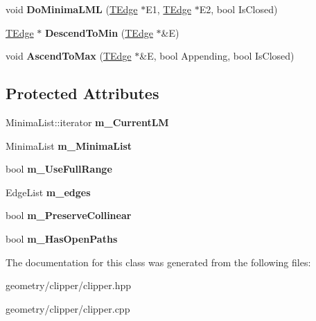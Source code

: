 \begin{DoxyCompactItemize}
void {\bfseries Do\+Minima\+L\+ML} (\mbox{\hyperlink{struct_clipper_lib_1_1_t_edge}{T\+Edge}} $\ast$E1, \mbox{\hyperlink{struct_clipper_lib_1_1_t_edge}{T\+Edge}} $\ast$E2, bool Is\+Closed)
\item 
\mbox{\label{class_clipper_lib_1_1_clipper_base_a13086e8d650edc1a024813d3a8469120}} 
\mbox{\hyperlink{struct_clipper_lib_1_1_t_edge}{T\+Edge}} $\ast$ {\bfseries Descend\+To\+Min} (\mbox{\hyperlink{struct_clipper_lib_1_1_t_edge}{T\+Edge}} $\ast$\&E)
\item 
\mbox{\label{class_clipper_lib_1_1_clipper_base_afafbf0dafffb5ad6f5a5c30dbed6378f}} 
void {\bfseries Ascend\+To\+Max} (\mbox{\hyperlink{struct_clipper_lib_1_1_t_edge}{T\+Edge}} $\ast$\&E, bool Appending, bool Is\+Closed)
\end{DoxyCompactItemize}
\subsection*{Protected Attributes}
\begin{DoxyCompactItemize}
\item 
\mbox{\label{class_clipper_lib_1_1_clipper_base_ab6ed40f62810c0f894878c79d74afb36}} 
Minima\+List\+::iterator {\bfseries m\+\_\+\+Current\+LM}
\item 
\mbox{\label{class_clipper_lib_1_1_clipper_base_a970749dc12a20e980c932af040f8a8c5}} 
Minima\+List {\bfseries m\+\_\+\+Minima\+List}
\item 
\mbox{\label{class_clipper_lib_1_1_clipper_base_aea11d183617adc12d7ba2b84533f7f45}} 
bool {\bfseries m\+\_\+\+Use\+Full\+Range}
\item 
\mbox{\label{class_clipper_lib_1_1_clipper_base_a8bfc007c0c0afd4e9d252dac0ef5daa0}} 
Edge\+List {\bfseries m\+\_\+edges}
\item 
\mbox{\label{class_clipper_lib_1_1_clipper_base_aad4ca0f2a16a6fb466036b36cc5ff638}} 
bool {\bfseries m\+\_\+\+Preserve\+Collinear}
\item 
\mbox{\label{class_clipper_lib_1_1_clipper_base_aa2508f5b2a599294c359271506441fbd}} 
bool {\bfseries m\+\_\+\+Has\+Open\+Paths}
\end{DoxyCompactItemize}


The documentation for this class was generated from the following files\+:\begin{DoxyCompactItemize}
\item 
geometry/clipper/clipper.\+hpp\item 
geometry/clipper/clipper.\+cpp\end{DoxyCompactItemize}
